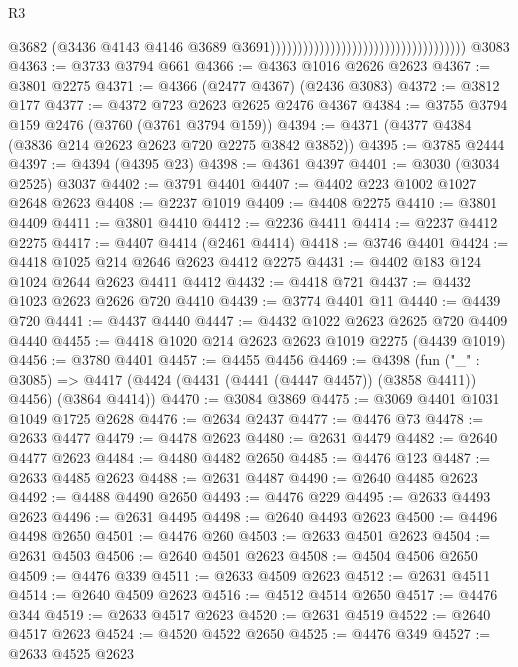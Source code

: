 \begin{lexlean}{R3}
\begin{coremodule}
                                                                          @3682
                                                                          (@3436
                                                                            @4143
                                                                            @4146
                                                                            @3689
                                                                            @3691))))))))))))))))))))))))))))))))))))
    @3083
@4363 := @3733 @3794 @661
@4366 := @4363 @1016 @2626 @2623
@4367 := @3801 @2275
@4371 := @4366 (@2477 @4367) (@2436 @3083)
@4372 := @3812 @177
@4377 := @4372 @723 @2623 @2625 @2476 @4367
@4384 := @3755 @3794 @159 @2476 (@3760 (@3761 @3794 @159))
@4394 := @4371 (@4377 @4384 (@3836 @214 @2623 @2623 @720 @2275 @3842 @3852))
@4395 := @3785 @2444
@4397 := @4394 (@4395 @23)
@4398 := @4361 @4397
@4401 := @3030 (@3034 @2525) @3037
@4402 := @3791 @4401
@4407 := @4402 @223 @1002 @1027 @2648 @2623
@4408 := @2237 @1019
@4409 := @4408 @2275
@4410 := @3801 @4409
@4411 := @3801 @4410
@4412 := @2236 @4411
@4414 := @2237 @4412 @2275
@4417 := @4407 @4414 (@2461 @4414)
@4418 := @3746 @4401
@4424 := @4418 @1025 @214 @2646 @2623 @4412 @2275
@4431 := @4402 @183 @124 @1024 @2644 @2623 @4411 @4412
@4432 := @4418 @721
@4437 := @4432 @1023 @2623 @2626 @720 @4410
@4439 := @3774 @4401 @11
@4440 := @4439 @720
@4441 := @4437 @4440
@4447 := @4432 @1022 @2623 @2625 @720 @4409 @4440
@4455 := @4418 @1020 @214 @2623 @2623 @1019 @2275 (@4439 @1019)
@4456 := @3780 @4401
@4457 := @4455 @4456
@4469 := @4398
    (fun ("_" : @3085) =>
    @4417 (@4424 (@4431 (@4441 (@4447 @4457)) (@3858 @4411)) @4456) (@3864 @4414))
@4470 := @3084 @3869
@4475 := @3069 @4401 @1031 @1049 @1725 @2628
@4476 := @2634 @2437
@4477 := @4476 @73
@4478 := @2633 @4477
@4479 := @4478 @2623
@4480 := @2631 @4479
@4482 := @2640 @4477 @2623
@4484 := @4480 @4482 @2650
@4485 := @4476 @123
@4487 := @2633 @4485 @2623
@4488 := @2631 @4487
@4490 := @2640 @4485 @2623
@4492 := @4488 @4490 @2650
@4493 := @4476 @229
@4495 := @2633 @4493 @2623
@4496 := @2631 @4495
@4498 := @2640 @4493 @2623
@4500 := @4496 @4498 @2650
@4501 := @4476 @260
@4503 := @2633 @4501 @2623
@4504 := @2631 @4503
@4506 := @2640 @4501 @2623
@4508 := @4504 @4506 @2650
@4509 := @4476 @339
@4511 := @2633 @4509 @2623
@4512 := @2631 @4511
@4514 := @2640 @4509 @2623
@4516 := @4512 @4514 @2650
@4517 := @4476 @344
@4519 := @2633 @4517 @2623
@4520 := @2631 @4519
@4522 := @2640 @4517 @2623
@4524 := @4520 @4522 @2650
@4525 := @4476 @349
@4527 := @2633 @4525 @2623

\end{coremodule}
\end{lexlean}

